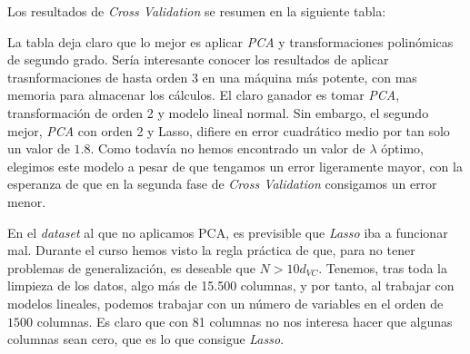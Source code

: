 \documentclass[11pt]{article}
\begin{document}
Los resultados de \emph{Cross Validation} se resumen en la siguiente tabla:

\begin{table}[H]
    \caption{Resultados de \emph{Cross Validation}, primera fase}
\end{table}

La tabla deja claro que lo mejor es aplicar \emph{PCA} y transformaciones polinómicas de segundo grado. Sería interesante conocer los resultados de aplicar trasnformaciones de hasta orden 3 en una máquina más potente, con mas memoria para almacenar los cálculos. El claro ganador es tomar \emph{PCA}, transformación de orden 2 y modelo lineal normal. Sin embargo, el segundo mejor, \emph{PCA} con orden 2 y Lasso, difiere en error cuadrático medio por tan solo un valor de $1.8$. Como todavía no hemos encontrado un valor de $\lambda$ óptimo, elegimos este modelo a pesar de que tengamos un error ligeramente mayor, con la esperanza de que en la segunda fase de \emph{Cross Validation} consigamos un error menor.

En el \emph{dataset} al que no aplicamos PCA, es previsible que \emph{Lasso} iba a funcionar mal. Durante el curso hemos visto la regla práctica de que, para no tener problemas de generalización, es deseable que $N > 10 d_{VC}
$. Tenemos, tras toda la limpieza de los datos, algo más de 15.500 columnas, y por tanto, al trabajar con modelos lineales, podemos trabajar con un número de variables en el orden de $1500$ columnas. Es claro que con 81 columnas no nos interesa hacer que algunas columnas sean cero, que es lo que consigue \emph{Lasso}.
\end{document}
